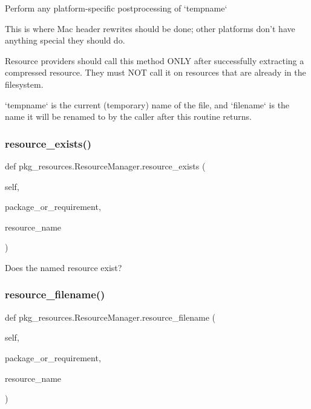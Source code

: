 \begin{DoxyVerb}Perform any platform-specific postprocessing of `tempname`

This is where Mac header rewrites should be done; other platforms don't
have anything special they should do.

Resource providers should call this method ONLY after successfully
extracting a compressed resource.  They must NOT call it on resources
that are already in the filesystem.

`tempname` is the current (temporary) name of the file, and `filename`
is the name it will be renamed to by the caller after this routine
returns.
\end{DoxyVerb}
 \mbox{\label{classpkg__resources_1_1ResourceManager_ad1b6e05f2dbd4022e832ce0fce52a49c}} 
\subsubsection{\texorpdfstring{resource\+\_\+exists()}{resource\_exists()}}
{\footnotesize\ttfamily def pkg\+\_\+resources.\+Resource\+Manager.\+resource\+\_\+exists (\begin{DoxyParamCaption}\item[{}]{self,  }\item[{}]{package\+\_\+or\+\_\+requirement,  }\item[{}]{resource\+\_\+name }\end{DoxyParamCaption})}

\begin{DoxyVerb}Does the named resource exist?\end{DoxyVerb}
 \mbox{\label{classpkg__resources_1_1ResourceManager_a6c85868c8de9cb637490e298ff1252c0}} 
\subsubsection{\texorpdfstring{resource\+\_\+filename()}{resource\_filename()}}
{\footnotesize\ttfamily def pkg\+\_\+resources.\+Resource\+Manager.\+resource\+\_\+filename (\begin{DoxyParamCaption}\item[{}]{self,  }\item[{}]{package\+\_\+or\+\_\+requirement,  }\item[{}]{resource\+\_\+name }\end{DoxyParamCaption})}

